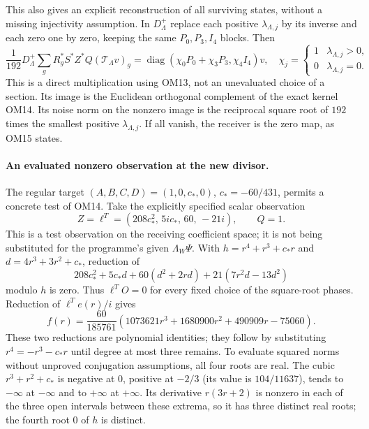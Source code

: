 \documentclass[11pt]{article}
\newcommand{\diag}{\operatorname{diag}}
\begin{document}
This also gives an explicit reconstruction of all surviving states,
without a missing injectivity assumption.  In $D_{\Lambda}^{+}$
replace each positive $\lambda_{\Lambda,j}$ by its inverse and each
zero one by zero, keeping the same $P_0,P_3,I_4$ blocks.  Then
\[
\frac1{192}D_\Lambda^+
\sum_gR_g^*S^*Z^*Q(\mathcal T_\Lambda v)_g
=\diag(\chi_0P_0+\chi_3P_3,\chi_4I_4)v,
\quad
\chi_j=\begin{cases}1&\lambda_{\Lambda,j}>0,\\0&\lambda_{\Lambda,j}=0.
\end{cases}
\tag{OM15}
\]
This is a direct multiplication using OM13, not an unevaluated
choice of a section.  Its image is the Euclidean orthogonal
complement of the exact kernel OM14.  Its noise norm on the
nonzero image is the reciprocal square root of $192$ times the
smallest positive $\lambda_{\Lambda,j}$.  If all vanish, the
receiver is the zero map, as OM15 states.

\paragraph{An evaluated nonzero observation at the new divisor.}
The regular target $(A,B,C,D)=(1,0,c_*,0)$, $c_*=-60/431$, permits
a concrete test of OM14.  Take the explicitly specified scalar
observation
\[
Z=\ell^T=(208c_*^2,\,5ic_*,\,60,\,-21i),\qquad Q=1.
\tag{OM16}
\]
This is a test observation on the receiving coefficient space;
it is not being substituted for the programme's given $\Lambda_W\Psi$.
With $h=r^4+r^3+c_*r$ and $d=4r^3+3r^2+c_*$, reduction of
\[
208c_*^2+5c_*d+60(d^2+2rd)+21(7r^2d-13d^2)
\]
modulo $h$ is zero.  Thus $\ell^TO=0$ for every fixed choice of
the square-root phases.  Reduction of $\ell^T e(r)/i$ gives
\[
f(r)=\frac{60}{185761}
 (1073621r^3+1680900r^2+490909r-75060).
\tag{OM17}
\]
These two reductions are polynomial identities; they follow by
substituting $r^4=-r^3-c_*r$ until degree at most three remains.
To evaluate squared norms without unproved conjugation assumptions,
all four roots are real.  The cubic $r^3+r^2+c_*$ is negative at
$0$, positive at $-2/3$ (its value is $104/11637$), tends to
$-\infty$ at $-\infty$ and to $+\infty$ at $+\infty$.
Its derivative $r(3r+2)$ is nonzero in each of the three open
intervals between these extrema, so it has three distinct real
roots; the fourth root $0$ of $h$ is distinct.
\end{document}
